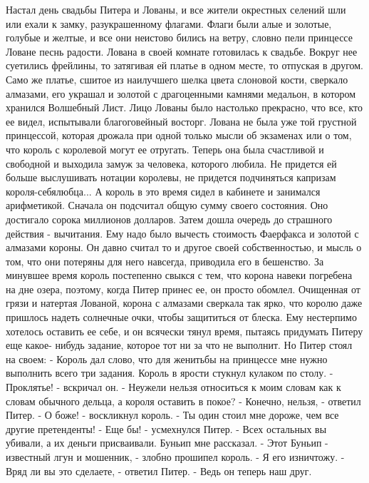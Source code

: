     Настал день свадьбы Питера и Лованы, и все жители окрестных 
селений шли или ехали к замку, разукрашенному флагами. Флаги были алые 
и золотые, голубые и желтые, и все они неистово бились на ветру, 
словно пели принцессе Ловане песнь радости.
    Лована в своей комнате готовилась к свадьбе. Вокруг нее суетились 
фрейлины, то затягивая ей платье в одном месте, то отпуская в другом. 
Само же платье, сшитое из наилучшего шелка цвета слоновой кости, 
сверкало алмазами, его украшал и золотой с драгоценными камнями 
медальон, в котором хранился Волшебный Лист. Лицо Лованы было 
настолько прекрасно, что все, кто ее видел, испытывали благоговейный 
восторг.
    Лована не была уже той грустной принцессой, которая дрожала при 
одной только мысли об экзаменах или о том, что король с королевой 
могут ее отругать. Теперь она была счастливой и свободной и выходила 
замуж за человека, которого любила. Не придется ей больше выслушивать 
нотации королевы, не придется подчиняться капризам короля-себялюбца...
    А король в это время сидел в кабинете и занимался арифметикой. 
Сначала он подсчитал общую сумму своего состояния. Оно достигало 
сорока миллионов долларов. Затем дошла очередь до страшного действия - 
вычитания. Ему надо было вычесть стоимость Фаерфакса и золотой с 
алмазами короны. Он давно считал то и другое своей собственностью, и 
мысль о том, что они потеряны для него навсегда, приводила его в 
бешенство.
    За минувшее время король постепенно свыкся с тем, что корона 
навеки погребена на дне озера, поэтому, когда Питер принес ее, он 
просто обомлел. Очищенная от грязи и натертая Лованой, корона с 
алмазами сверкала так ярко, что королю даже пришлось надеть солнечные 
очки, чтобы защититься от блеска. Ему нестерпимо хотелось оставить ее 
себе, и он всячески тянул время, пытаясь придумать Питеру еще какое-
нибудь задание, которое тот ни за что не выполнит.
    Но Питер стоял на своем:
    - Король дал слово, что для женитьбы на принцессе мне нужно 
выполнить всего три задания.
    Король в ярости стукнул кулаком по столу.
    - Проклятье! - вскричал он. - Неужели нельзя относиться к моим 
словам как к словам обычного дельца, а короля оставить в покое?
    - Конечно, нельзя, - ответил Питер.
    - О боже! - воскликнул король. - Ты один стоил мне дороже, чем все 
другие претенденты!
    - Еще бы! - усмехнулся Питер. - Всех остальных вы убивали, а их 
деньги присваивали. Буньип мне рассказал.
    - Этот Буньип - известный лгун и мошенник, - злобно прошипел 
король. - Я его изничтожу.
    - Вряд ли вы это сделаете, - ответил Питер. - Ведь он теперь наш 
друг.
